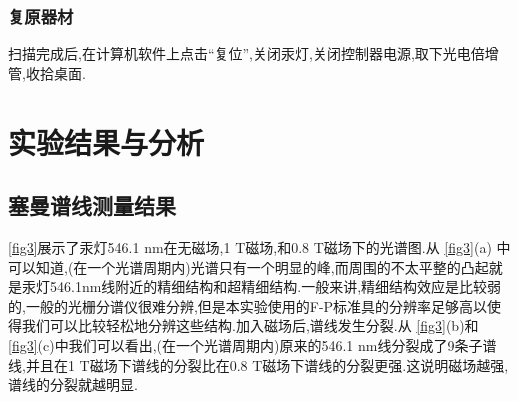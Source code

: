 \documentclass[font=default]{mpltx}
\begin{document}
\subsubsection{复原器材}
扫描完成后,在计算机软件上点击``复位'',关闭汞灯,关闭控制器电源,取下光电倍增管,收拾桌面.


\section{实验结果与分析}
\subsection{塞曼谱线测量结果}
\autoref{fig3}展示了汞灯546.1 nm在无磁场,1 T磁场,和0.8 T磁场下的光谱图.从 \autoref{fig3}(a) 中可以知道,(在一个光谱周期内)光谱只有一个明显的峰,而周围的不太平整的凸起就是汞灯546.1nm线附近的精细结构和超精细结构.一般来讲,精细结构效应是比较弱的,一般的光栅分谱仪很难分辨,但是本实验使用的F-P标准具的分辨率足够高以使得我们可以比较轻松地分辨这些结构.加入磁场后,谱线发生分裂.从 \autoref{fig3}(b)和 \autoref{fig3}(c)中我们可以看出,(在一个光谱周期内)原来的546.1 nm线分裂成了9条子谱线,并且在1 T磁场下谱线的分裂比在0.8 T磁场下谱线的分裂更强.这说明磁场越强,谱线的分裂就越明显.
\end{document}
